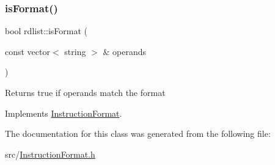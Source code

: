 \subsubsection{\texorpdfstring{is\+Format()}{isFormat()}}
{\footnotesize\ttfamily bool rdlist\+::is\+Format (\begin{DoxyParamCaption}\item[{const vector$<$ string $>$ \&}]{operands }\end{DoxyParamCaption})\hspace{0.3cm}{\ttfamily [virtual]}}

Returns true if operands match the format 

Implements \hyperlink{classInstructionFormat_a9fdcf94dcd7d9a55ba86e7a63f04d1fe}{Instruction\+Format}.



The documentation for this class was generated from the following file\+:\begin{DoxyCompactItemize}
\item 
src/\hyperlink{InstructionFormat_8h}{Instruction\+Format.\+h}\end{DoxyCompactItemize}
